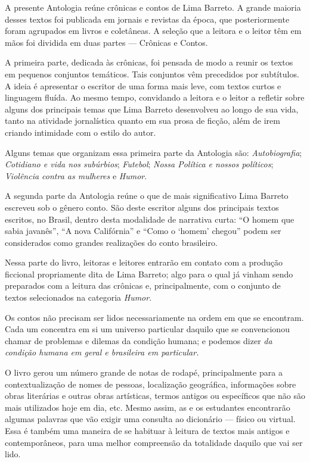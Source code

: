 
\noindent{}A presente Antologia reúne crônicas e contos de Lima Barreto. A grande
maioria desses textos foi publicada em jornais e revistas da época, que
posteriormente foram agrupados em livros e coletâneas. A seleção que a
leitora e o leitor têm em mãos foi dividida em duas partes --- Crônicas e
Contos.

A primeira parte, dedicada às crônicas, foi pensada de modo a reunir os
textos em pequenos conjuntos temáticos. Tais conjuntos vêm precedidos
por subtítulos. A ideia é apresentar o escritor de uma forma mais leve,
com textos curtos e linguagem fluída. Ao mesmo tempo, convidando a
leitora e o leitor a refletir sobre alguns dos principais temas que Lima
Barreto desenvolveu ao longo de sua vida, tanto na atividade
jornalística quanto em sua prosa de ficção, além de irem criando
intimidade com o estilo do autor.

Alguns temas que organizam essa primeira parte da Antologia são:
\textit{Autobiografia}; \textit{Cotidiano e vida nos subúrbios};
\textit{Futebol}; \textit{Nossa Política e nossos políticos};
\textit{Violência contra as mulheres} e \textit{Humor}.

A segunda parte da Antologia reúne o que de mais significativo Lima
Barreto escreveu sob o gênero conto. São deste escritor alguns dos
principais textos escritos, no Brasil, dentro desta modalidade de
narrativa curta: ``O homem que sabia javanês'', ``A nova Califórnia'' e
``Como o `homem' chegou'' podem ser considerados como grandes
realizações do conto brasileiro.

Nessa parte do livro, leitoras e leitores entrarão em contato com a
produção ficcional propriamente dita de Lima Barreto; algo para o qual
já vinham sendo preparados com a leitura das crônicas e, principalmente,
com o conjunto de textos selecionados na categoria \emph{Humor}.

Os contos não precisam ser lidos necessariamente na ordem em que se
encontram. Cada um concentra em si um universo particular daquilo que se
convencionou chamar de problemas e dilemas da condição humana; e podemos
dizer \emph{da condição humana em geral e brasileira em particular.}

O livro gerou um número grande de notas de rodapé, principalmente para a
contextualização de nomes de pessoas, localização geográfica,
informações sobre obras literárias e outras obras artísticas, termos
antigos ou específicos que não são mais utilizados hoje em dia, etc.
Mesmo assim, as e os estudantes encontrarão algumas palavras que vão
exigir uma consulta ao dicionário --- físico ou virtual. Essa é também
uma maneira de se habituar à leitura de textos mais antigos e
contemporâneos, para uma melhor compreensão da totalidade daquilo que
vai ser lido.
